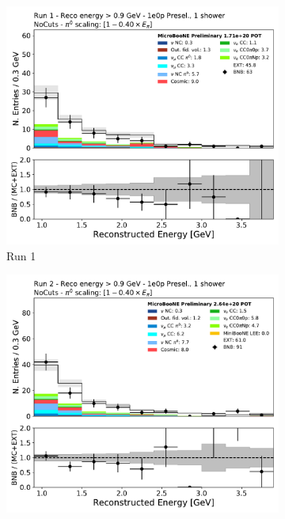 \begin{figure}[H]
    \centering
    \begin{subfigure}{0.3\textwidth}
    \includegraphics[width=1.0\textwidth]{1e0p/High_E_Sideband/run1/reco_e_highe.pdf}
    \caption{Run 1}
    \end{subfigure}
    \begin{subfigure}{0.3\textwidth}
    \includegraphics[width=1.0\textwidth]{1e0p/High_E_Sideband/run2/reco_e_highe.pdf}

\end{subfigure}
\end{figure}
